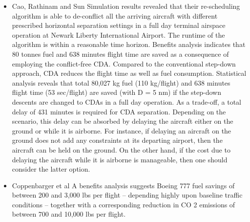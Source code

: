 \documentclass{aer1315-pretty}
\begin{document}
\begin{itemize}
\item Cao, Rathinam and Sun \cite{Cao:2011} 
Simulation results revealed that their re-scheduling algorithm is able to de-conflict all the arriving aircraft with different prescribed horizontal separation settings in a full day terminal airspace operation at Newark Liberty International Airport. The runtime of the algorithm is within a reasonable time horizon. Benefits analysis indicates that 80 tonnes fuel and 638 minutes flight time are saved as a consequence of employing the conflict-free CDA. Compared to the conventional step-down approach, CDA reduces the flight time as well as fuel consumption. Statistical analysis reveals that total 80,027 kg fuel (110 kg/flight) and 638 minutes flight time (53 sec/flight)
are saved (with D = 5 nm) if the step-down descents are changed to CDAs in a full day operation. As a trade-off, a total delay of 431 minutes is required for CDA separation. Depending on the scenario, this delay can be absorbed by delaying the aircraft either on the ground or while it is airborne. For instance, if delaying an aircraft on the ground does not add any constraints at its departing airport, then the aircraft can be held on the ground. On the other hand, if the cost due to delaying the aircraft while it is airborne is manageable, then one should consider the latter option.


\item Coppenbarger et al \cite{Copp:2007} 
A benefits analysis suggests Boeing 777 fuel savings of between 200 and 3,000 lbs per flight – depending highly upon baseline traffic conditions – together with a corresponding reduction in CO 2 emissions of between 700 and 10,000 lbs per flight.


\end{itemize}
\end{document}
